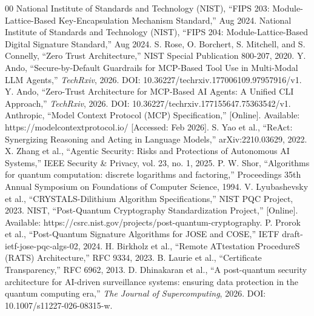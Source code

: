 \documentclass[conference]{IEEEtran}
\begin{document}
\balance
\begin{thebibliography}{00}
 National Institute of Standards and Technology (NIST), ``FIPS 203: Module-Lattice-Based Key-Encapsulation Mechanism Standard,'' Aug 2024.
 National Institute of Standards and Technology (NIST), ``FIPS 204: Module-Lattice-Based Digital Signature Standard,'' Aug 2024.
 S. Rose, O. Borchert, S. Mitchell, and S. Connelly, ``Zero Trust Architecture,'' NIST Special Publication 800-207, 2020.
 Y. Ando, ``Secure-by-Default Guardrails for MCP-Based Tool Use in Multi-Modal LLM Agents,'' \textit{TechRxiv}, 2026. DOI: 10.36227/techrxiv.177006109.97957916/v1.
 Y. Ando, ``Zero-Trust Architecture for MCP-Based AI Agents: A Unified CLI Approach,'' \textit{TechRxiv}, 2026. DOI: 10.36227/techrxiv.177155647.75363542/v1.
 Anthropic, ``Model Context Protocol (MCP) Specification,'' [Online]. Available: https://modelcontextprotocol.io/ [Accessed: Feb 2026].
 S. Yao et al., ``ReAct: Synergizing Reasoning and Acting in Language Models,'' arXiv:2210.03629, 2022.
 X. Zhang et al., ``Agentic Security: Risks and Protections of Autonomous AI Systems,'' IEEE Security \& Privacy, vol. 23, no. 1, 2025.
 P. W. Shor, ``Algorithms for quantum computation: discrete logarithms and factoring,'' Proceedings 35th Annual Symposium on Foundations of Computer Science, 1994.
 V. Lyubashevsky et al., ``CRYSTALS-Dilithium Algorithm Specifications,'' NIST PQC Project, 2023.
 NIST, ``Post-Quantum Cryptography Standardization Project,'' [Online]. Available: https://csrc.nist.gov/projects/post-quantum-cryptography.
 P. Prorok et al., ``Post-Quantum Signature Algorithms for JOSE and COSE,'' IETF draft-ietf-jose-pqc-algs-02, 2024.
 H. Birkholz et al., ``Remote ATtestation ProcedureS (RATS) Architecture,'' RFC 9334, 2023.
 B. Laurie et al., ``Certificate Transparency,'' RFC 6962, 2013.
 D. Dhinakaran et al., ``A post-quantum security architecture for AI-driven surveillance systems: ensuring data protection in the quantum computing era,'' \textit{The Journal of Supercomputing}, 2026. DOI: 10.1007/s11227-026-08315-w.
\end{thebibliography}
\end{document}
